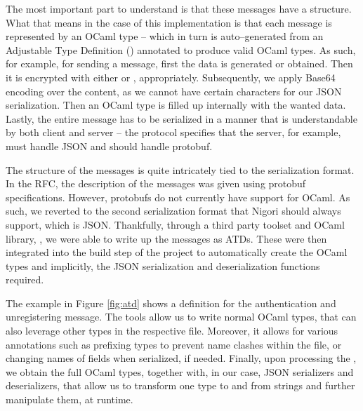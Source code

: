 
The most important part to understand is that these messages have a structure.
What that means in the case of this implementation is that each message is represented by an OCaml type -- which in turn is auto--generated from an Adjustable Type Definition () annotated to produce valid OCaml types.
As such, for example, for sending a message, first the data is generated or obtained.
Then it is encrypted with either  or , appropriately.
Subsequently, we apply Base64 encoding over the content, as we cannot have certain characters for our JSON serialization.
Then an OCaml type is filled up internally with the wanted data.
Lastly, the entire message has to be serialized in a manner that is understandable by both client and server -- the protocol specifies that the server, for example, must handle JSON and should handle protobuf.

The structure of the messages is quite intricately tied to the serialization format.
In the RFC, the description of the messages was given using protobuf specifications.
However, protobufs do not currently have support for OCaml.
As such, we reverted to the second serialization format that Nigori should always support, which is JSON.
Thankfully, through a third party toolset and OCaml library, , we were able to write up the messages as ATDs.
These were then integrated into the build step of the project to automatically create the OCaml types and implicitly, the JSON serialization and deserialization functions required.


The example in Figure \ref{fig:atd} shows a definition for the authentication and unregistering message.
The  tools allow us to write normal OCaml types, that can also leverage other types in the respective file.
Moreover, it allows for various annotations such as prefixing types to prevent name clashes within the file, or changing names of fields when serialized, if needed.
Finally, upon processing the , we obtain the full OCaml types, together with, in our case, JSON serializers and deserializers, that allow us to transform one type to and from strings and further manipulate them, at runtime.

